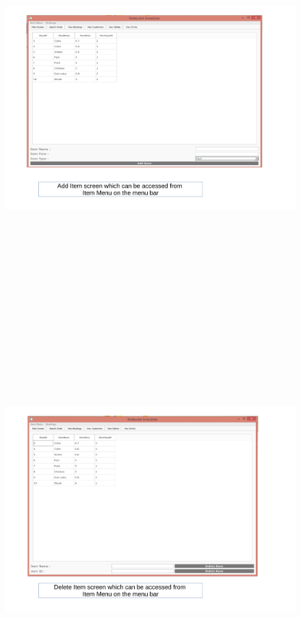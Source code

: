 \begin{landscape}
\begin{figure}[H]
    \includegraphics[height = 15cm]{./Maintenance/images/screen5}
    \caption{} \label{fig:screen5}
\end{figure}

\begin{figure}[H]
    \includegraphics[height = 15cm]{./Maintenance/images/screen6}
    \caption{} \label{fig:screen6}
\end{figure}


\end{landscape}

